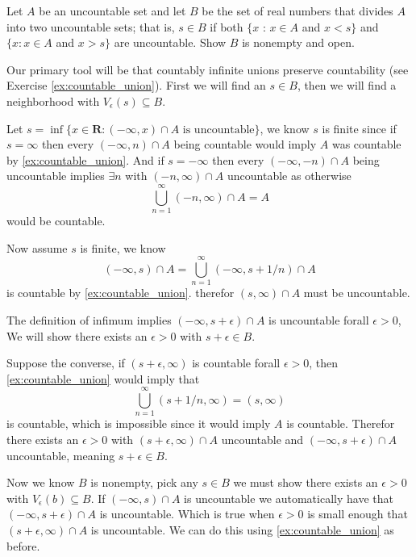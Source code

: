 \begin{exercise}
  Let $A$ be an uncountable set and let $B$ be the set of real numbers that divides $A$ into two uncountable sets; that is, $s \in B$ if both $\{x$ : $x \in A$ and $x<s\}$ and $\{x: x \in A$ and $x>s\}$ are uncountable. Show $B$ is nonempty and open.
\end{exercise}

\begin{solution}
  Our primary tool will be that countably infinite unions preserve countability (see Exercise \ref{ex:countable_union}). First we will find an $s \in B$, then we will find a neighborhood with $V_\epsilon(s) \subseteq B$.

  Let $s = \inf \{x \in \mathbf{R} : (-\infty, x) \cap A \text{ is uncountable}\}$, we know $s$ is finite since if $s = \infty$ then every $(-\infty, n) \cap A$ being countable would imply $A$ was countable by \ref{ex:countable_union}.
  And if $s = -\infty$ then every $(-\infty, -n) \cap A$ being uncountable implies $\exists n$ with $(-n, \infty) \cap A$ uncountable as otherwise
  $$
  \bigcup_{n=1}^\infty (-n, \infty) \cap A = A
  $$
  would be countable.

  Now assume $s$ is finite, we know
  $$(-\infty, s) \cap A = \bigcup_{n=1}^\infty (-\infty, s+1/n) \cap A$$
  is countable by \ref{ex:countable_union}. therefor $(s, \infty) \cap A$ must be uncountable.

  The definition of infimum implies $(-\infty, s+\epsilon) \cap A$ is uncountable forall $\epsilon > 0$, We will show there exists an $\epsilon > 0$ with $s+\epsilon \in B$.

  Suppose the converse, if $(s+\epsilon, \infty)$ is countable forall $\epsilon > 0$, then \ref{ex:countable_union} would imply that
  $$\bigcup_{n=1}^\infty (s+1/n, \infty) = (s, \infty)$$
  is countable, which is impossible since it would imply $A$ is countable. Therefor there exists an $\epsilon > 0$ with $(s+\epsilon, \infty) \cap A$ uncountable and $(-\infty, s+\epsilon) \cap A$ uncountable, meaning $s+\epsilon \in B$.

  Now we know $B$ is nonempty, pick any $s \in B$ we must show there exists an $\epsilon > 0$ with $V_\epsilon(b) \subseteq B$. If $(-\infty, s) \cap A$ is uncountable we automatically have that $(-\infty, s+\epsilon) \cap A$ is uncountable. Which is true when $\epsilon > 0$ is small enough that $(s+\epsilon, \infty) \cap A$ is uncountable. We can do this using \ref{ex:countable_union} as before.
\end{solution}

